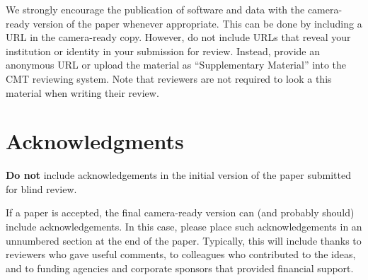 \documentclass{article}
\begin{document}
We strongly encourage the publication of software and data with the
camera-ready version of the paper whenever appropriate.  This can be
done by including a URL in the camera-ready copy.  However, do not
include URLs that reveal your institution or identity in your
submission for review.  Instead, provide an anonymous URL or upload
the material as ``Supplementary Material'' into the CMT reviewing
system.  Note that reviewers are not required to look a this material
when writing their review.


\section*{Acknowledgments}

\textbf{Do not} include acknowledgements in the initial version of
the paper submitted for blind review.

If a paper is accepted, the final camera-ready version can (and
probably should) include acknowledgements. In this case, please
place such acknowledgements in an unnumbered section at the
end of the paper. Typically, this will include thanks to reviewers
who gave useful comments, to colleagues who contributed to the ideas,
and to funding agencies and corporate sponsors that provided financial
support.


\nocite{langley00}



\end{document}
